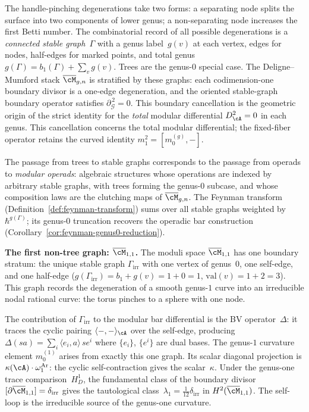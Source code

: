 The handle-pinching degenerations take two forms: a separating node
splits the surface into two components of lower genus; a
non-separating node increases the first Betti number. The
combinatorial record of all possible degenerations is a
\emph{connected stable graph}~$\Gamma$ with a genus label~$g(v)$
at each vertex, edges for nodes, half-edges for marked points, and
total genus $g(\Gamma) = b_1(\Gamma) + \sum_v g(v)$. Trees are
the genus-$0$ special case. The Deligne--Mumford stack
$\overline{\cM}_{g,n}$ is stratified by these graphs: each
codimension-one boundary divisor is a one-edge degeneration, and the
oriented stable-graph boundary operator satisfies
$\partial_{\mathcal G}^{\,2}=0$. This boundary cancellation is the
geometric origin of the strict identity for the \emph{total} modular
differential $D_\cA^2 = 0$ in each genus.  This cancellation concerns
the total modular differential; the fixed-fiber operator retains the
curved identity $m_1^2=[m_0^{(g)},-]$.

The passage from trees to stable graphs corresponds to the passage from
operads to \emph{modular operads}: algebraic structures whose
operations are indexed by arbitrary stable graphs, with trees forming
the genus-$0$ subcase, and whose composition laws are the clutching maps of
$\overline{\cM}_{g,n}$. The Feynman transform
(Definition~\ref{def:feynman-transform}) sums over all stable
graphs weighted by $\hbar^{g(\Gamma)}$; its genus-$0$ truncation
recovers the operadic bar construction
(Corollary~\ref{cor:feynman-genus0-reduction}).

\smallskip\noindent\textbf{The first non-tree graph:
$\overline{\cM}_{1,1}$.}\enspace
The moduli space $\overline{\cM}_{1,1}$ has one boundary stratum:
the unique stable graph $\Gamma_{\mathrm{irr}}$ with one vertex of
genus~$0$, one self-edge, and one half-edge
($g(\Gamma_{\mathrm{irr}}) = b_1 + g(v) = 1 + 0 = 1$,
$\mathrm{val}(v) = 1 + 2 = 3$). This graph records the
degeneration of a smooth genus-$1$ curve into an irreducible nodal
rational curve: the torus pinches to a sphere with one node.

The contribution of $\Gamma_{\mathrm{irr}}$ to the modular bar
differential is the BV operator~$\Delta$: it traces the cyclic
pairing $\langle -, - \rangle_\cA$ over the self-edge, producing
$\Delta(sa) = \sum_i \langle e_i, a \rangle\,se^i$ where
$\{e_i\}$, $\{e^i\}$ are dual bases. The genus-$1$ curvature element
$m_0^{(1)}$ arises from exactly this one graph. Its scalar diagonal
projection is $\kappa(\cA)\cdot\omega_1^{\mathrm{Ar}}$: the cyclic
self-contraction gives the scalar~$\kappa$.  Under the genus-one trace
comparison~$H_D^1$, the fundamental class of the boundary
divisor $[\partial\overline{\cM}_{1,1}] = \delta_{\mathrm{irr}}$
gives the tautological class~$\lambda_1 =
\tfrac{1}{12}\delta_{\mathrm{irr}}$ in
$H^2(\overline{\cM}_{1,1})$.  The self-loop is the irreducible source
of the genus-one curvature.

